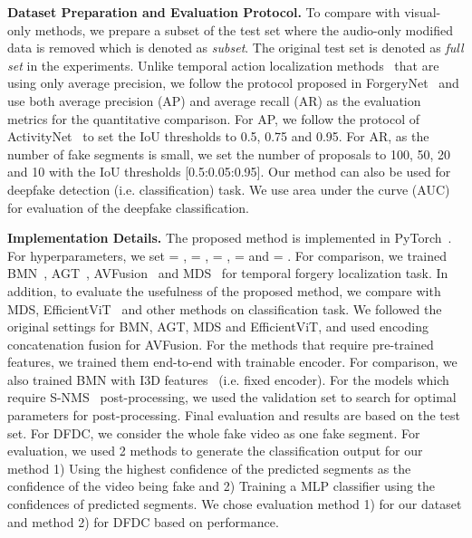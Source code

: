 \documentclass[conference, a4paper]{IEEEtran}
\makeatletter
\newcommand*{\ie}{i.e.\@\xspace}
\makeatother
\begin{document}
\noindent \textbf{Dataset Preparation and Evaluation Protocol.} To compare with visual-only methods, we prepare a subset of the test set where the audio-only modified data is removed which is denoted as \textit{subset}. The original test set is denoted as \textit{full set} in the experiments. Unlike temporal action localization methods~\cite{liu_multi-shot_2021, nawhal_activity_2021} that are using only average precision, we follow the protocol proposed in  ForgeryNet~\cite{he_forgerynet_2021} and use both average precision (AP) and average recall (AR) as the evaluation metrics for the quantitative comparison. For AP, we follow the protocol of ActivityNet~\cite{caba_heilbron_activitynet_2015} to set the IoU thresholds to 0.5, 0.75 and 0.95. For AR, as the number of fake segments is small, we set the number of proposals to 100, 50, 20 and 10 with the IoU thresholds [0.5:0.05:0.95]. Our method can also be used for deepfake detection (\ie classification) task. We use area under the curve (AUC) for evaluation of the deepfake classification.

\noindent \textbf{Implementation Details.} The proposed method is implemented in PyTorch~\cite{paszke_pytorch_2019}. For hyperparameters, we set  = ,  = ,  = ,  =  and  = . For comparison, we trained BMN~\cite{lin_bmn_2019}, AGT~\cite{nawhal_activity_2021}, AVFusion~\cite{bagchi_hear_2021} and MDS~\cite{chugh_not_2020} for temporal forgery localization task. In addition, to evaluate the usefulness of the proposed method, we compare with MDS, EfficientViT~\cite{coccomini_combining_2022} and other methods on classification task. We followed the original settings for BMN, AGT, MDS and EfficientViT, and used encoding concatenation fusion for AVFusion. For the methods that require pre-trained features, we trained them end-to-end with trainable encoder. For comparison, we also trained BMN with I3D features~\cite{carreira_quo_2017} (\ie fixed encoder). For the models which require S-NMS~\cite{bodla_soft-nms_2017} post-processing, we used the validation set to search for optimal parameters for post-processing. Final evaluation and results are based on the test set. For DFDC, we consider the whole fake video as one fake segment. For evaluation, we used 2 methods to generate the classification output for our method 1) Using the highest confidence of the predicted segments as the confidence of the video being fake and 2) Training a MLP classifier using the confidences of predicted segments. We chose evaluation method 1) for our dataset and method 2) for DFDC based on performance.
\end{document}
